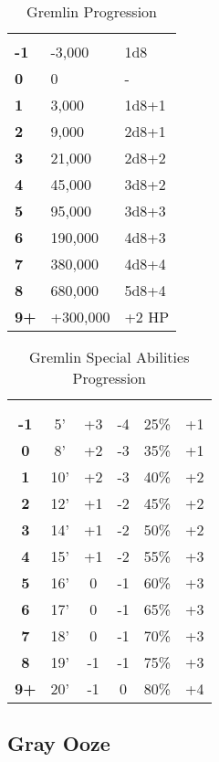 \begin{multicols*}{2}
\begin {table}[H]
  \caption{Gremlin Progression}
  \begin{tabularx}{\columnwidth}{>{\bfseries}YYY}
	 &  & \\
	-1 & -3,000 & 1d8\\
	0 & 0 & -\\
	1 & 3,000 & 1d8+1\\
	2 & 9,000 & 2d8+1\\
	3 & 21,000 & 2d8+2\\
	4 & 45,000 & 3d8+2\\
	5 & 95,000 & 3d8+3\\
	6 & 190,000 & 4d8+3\\
	7 & 380,000 & 4d8+4\\
	8 & 680,000 & 5d8+4\\
	9+ & +300,000 & +2 HP
  \end {tabularx}
\end {table}

\begin {table}[H]
  \caption{Gremlin Special Abilities Progression}\label{tab:Gremlin Special Abilities Progression}
  \begin{tabularx}{\columnwidth}{>{\bfseries}ccccYY}
	\thead{} &  & \thead{} & \thead{} & \thead{}\\
	 &  &  &  &  & \\
	-1 & 5' & +3 & -4 & 25\% & +1\\
	0 & 8' & +2 & -3 & 35\% & +1\\
	1 & 10' & +2 & -3 & 40\% & +2\\
	2 & 12' & +1 & -2 & 45\% & +2\\
	3 & 14' & +1 & -2 & 50\% & +2\\
	4 & 15' & +1 & -2 & 55\% & +3\\
	5 & 16' & 0 & -1 & 60\% & +3\\
	6 & 17' & 0 & -1 & 65\% & +3\\
	7 & 18' & 0 & -1 & 70\% & +3\\
	8 & 19' & -1 & -1 & 75\% & +3\\
	9+ & 20' & -1 & 0 & 80\% & +4
  \end {tabularx}
\end {table}

\subsection{Gray Ooze}
\end{multicols*}
